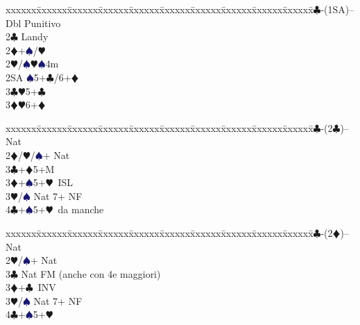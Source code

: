 \documentclass[a4paper,italian]{article}
\newcommand{\BC}{\textcolor{OliveGreen}{$\clubsuit$}}
\newcommand{\BD}{\textcolor{RedOrange}{$\vardiamondsuit$}}
\newcommand{\BH}{\textcolor{Red2}{$\varheartsuit${}}}
\newcommand{\BS}{\textcolor{MidnightBlue}{$\spadesuit${}}}
\newenvironment{bidtable}
{\begin{tabbing}

    xxxxxx\=xxxxxx\=xxxxxx\=xxxxxx\=xxxxxx\=xxxxxx\=xxxxxx\=xxxxxx\=xxxxxx\=xxxxxx\=\kill}
{\end{tabbing} }%
\begin{document}
\begin{multicols}{2}
                                        \begin{bidtable}
                                            1\BC-(1SA)--\+\\
                                            Dbl \> Punitivo\\
                                            2\BC \> Landy\\
                                            2\BD {}+\BS /\BH \\
                                            2\BH/\BS {}\BH \BS 4m\\
                                            2SA \BS 5+\BC /6+\BD \\
                                            3\BC {}\BH 5+\BC \\
                                            3\BD {}\BH 6+\BD \-
                                        \end{bidtable}
                                        \bigbreak
                                        \begin{bidtable}
                                            1\BC-(2\BC)-- \> \> Nat\+\\
                                            2\BD/\BH/\BS {}+ Nat\\
                                            3\BC {}+\BD 5+M\\
                                            3\BD {}+\BS 5+\BH\ ISL\\
                                            3\BH/\BS \> Nat 7+ NF\\
                                            4\BC {}+\BS 5+\BH\ da manche\-
                                        \end{bidtable}
                                        \bigbreak
                                        \begin{bidtable}
                                            1\BC-(2\BD)-- \> \> Nat\+\\
                                            2\BH/\BS {}+ Nat\\
                                            3\BC \> Nat FM (anche con 4e maggiori)\\
                                            3\BD {}+\BC\ INV\\
                                            3\BH/\BS \> Nat 7+ NF\\
                                            4\BC {}+\BS 5+\BH \-

\end{bidtable}
\end{multicols}
\end{document}
